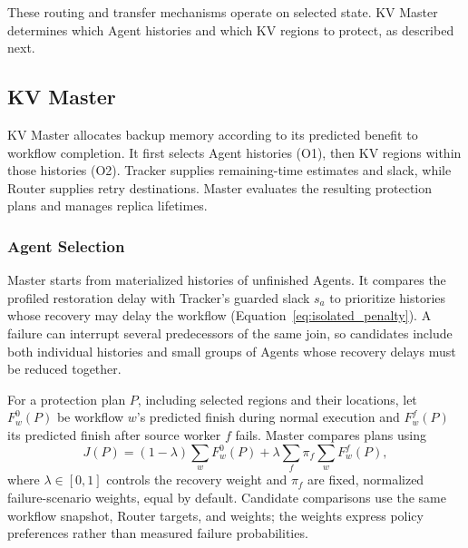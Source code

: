 These routing and transfer mechanisms operate on selected state.
KV Master determines which Agent histories and which KV regions to
protect, as described next.

\subsection{KV Master}
\label{sec:master}

KV Master allocates backup memory according to its predicted benefit to
workflow completion. It first selects Agent histories (O1), then KV
regions within those histories (O2). Tracker supplies remaining-time
estimates and slack, while Router supplies retry destinations. Master
evaluates the resulting protection plans and manages replica lifetimes.

\subsubsection{Agent Selection}
\label{sec:agent-protection}

Master starts from materialized histories of unfinished Agents.
It compares the profiled restoration delay with Tracker's guarded slack
$s_a$ to prioritize histories whose recovery may delay the workflow
(Equation~\ref{eq:isolated_penalty}). A failure can interrupt several
predecessors of the same join, so candidates include both individual
histories and small groups of Agents whose recovery delays must be
reduced together.

For a protection plan $P$, including selected regions and their
locations, let $F_w^0(P)$ be workflow $w$'s predicted finish during normal
execution and $F_w^f(P)$ its predicted finish after source worker $f$
fails. Master compares plans using
\begin{equation}
 J(P)=(1-\lambda)\sum_w F_w^0(P)
       +\lambda\sum_f\pi_f\sum_w F_w^f(P),
 \label{eq:objective}
\end{equation}
where $\lambda\in[0,1]$ controls the recovery weight and $\pi_f$ are fixed,
normalized failure-scenario weights, equal by default. Candidate
comparisons use the same workflow snapshot, Router targets, and weights;
the weights express policy preferences rather than measured failure
probabilities.

